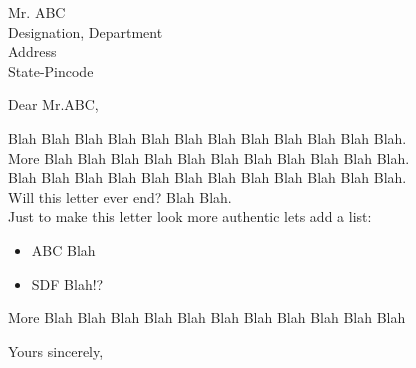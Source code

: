 \documentclass[12pt]{letter}
\date{\today} %
\begin{document}
\begin{letter}
{Mr. ABC\\	%
Designation, Department\\
Address\\
State-Pincode}

\opening{Dear Mr.ABC,} %
Blah Blah Blah Blah Blah Blah Blah Blah Blah Blah Blah Blah.\\
More Blah Blah Blah Blah Blah Blah Blah Blah Blah Blah Blah.\\  %

Blah Blah Blah Blah Blah Blah Blah Blah Blah Blah Blah Blah.\\
Will this letter ever end? Blah Blah.\\

Just to make this letter look more authentic lets add a list:
\begin{itemize} %
\item ABC Blah
\item SDF Blah!?
\end{itemize}

More Blah Blah Blah Blah Blah Blah Blah Blah Blah Blah Blah

\closing{Yours sincerely,}

\end{letter}
\end{document}
